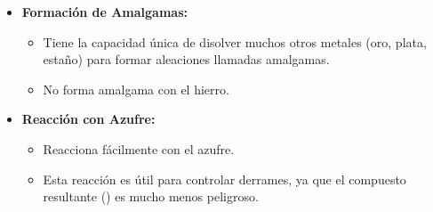 \begin{frame}
    \begin{itemize}
        \item \textbf{Formación de Amalgamas:}
            \begin{itemize}
                \item Tiene la capacidad única de disolver muchos otros metales 
									(oro, plata, estaño) para formar aleaciones llamadas amalgamas.
                \item No forma amalgama con el hierro.
            \end{itemize}
        \medskip
        \item \textbf{Reacción con Azufre:}
            \begin{itemize}
                \item Reacciona fácilmente con el azufre.
                \item Esta reacción es útil para controlar derrames, ya que el 
									compuesto resultante () es mucho menos peligroso.
            \end{itemize}
    \end{itemize}
\end{frame}
